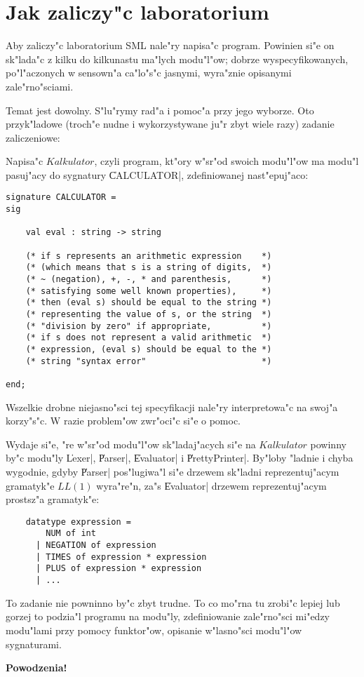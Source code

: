 \chapter{
Jak zaliczy"c laboratorium}

Aby zaliczy"c laboratorium SML nale"ry napisa"c program.
Powinien si"e on sk"la\-da"c z kilku do kilkunastu ma"lych
modu"l"ow; dobrze wyspecyfikowanych, po\-"l"a\-czo\-nych
w sensown"a ca"lo"s"c jasnymi, wyra"znie opisanymi zale"rno"sciami.

Temat jest dowolny. S"lu"rymy rad"a i pomoc"a przy jego wyborze.
Oto przyk"ladowe (troch"e nudne i wykorzystywane ju"r zbyt wiele razy) zadanie zaliczeniowe:

\bigskip

\bigskip
Napisa"c $Kalkulator$, czyli program, kt"ory w"sr"od swoich modu"l"ow ma modu"l
pasuj"acy do sygnatury \|CALCULATOR|, zdefiniowanej nast"epuj"aco:

\begin{verbatim}
signature CALCULATOR =
sig
    
    val eval : string -> string

    (* if s represents an arithmetic expression    *)
    (* (which means that s is a string of digits,  *)
    (* ~ (negation), +, -, * and parenthesis,      *)
    (* satisfying some well known properties),     *)
    (* then (eval s) should be equal to the string *) 
    (* representing the value of s, or the string  *)
    (* "division by zero" if appropriate,          *)
    (* if s does not represent a valid arithmetic  *)
    (* expression, (eval s) should be equal to the *)
    (* string "syntax error"                       *)

end;
\end{verbatim}

Wszelkie drobne niejasno"sci tej specyfikacji nale"ry interpretowa"c 
na swoj"a korzy"s"c. W razie problem"ow zwr"oci"c si"e o pomoc.

Wydaje si"e, "re w"sr"od modu"l"ow sk"ladaj"acych si"e na $Kalkulator$ 
powinny by"c modu"ly \|Lexer|, \|Parser|, \|Evaluator| i \|PrettyPrinter|. 
By"loby "ladnie i chyba wygodnie, gdyby \|Parser|
pos"lugiwa"l si"e drzewem sk"ladni reprezentuj"acym gramatyk"e $LL(1)$ wyra"re"n,
za"s \|Evaluator| drzewem reprezentuj"acym prostsz"a gramatyk"e:
\begin{verbatim} 
    datatype expression =
        NUM of int
      | NEGATION of expression
      | TIMES of expression * expression
      | PLUS of expression * expression
      | ...
\end{verbatim}

To zadanie nie powninno by"c zbyt trudne.
To co mo"rna tu zrobi"c lepiej lub gorzej to podzia"l programu na modu"ly,
zdefiniowanie zale"rno"sci mi"edzy modu"lami przy pomocy funktor"ow,
opisanie w"lasno"sci modu"l"ow sygnaturami.


\vspace{0.3cm}

{\bf Powodzenia!}



